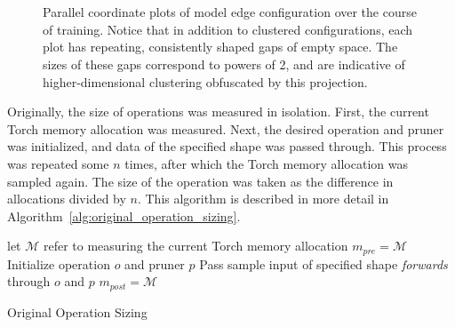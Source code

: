 \begin{figure}
     \\
     \\
	\caption{Parallel coordinate plots of model edge configuration over the course of training. Notice that in addition to
	clustered configurations, each plot has repeating, consistently shaped gaps of empty space. The sizes of these gaps
	correspond to powers of 2, and are indicative of higher-dimensional clustering obfuscated by this projection.}
	\label{fig:lambdapcps}
\end{figure}
\newpage


\ndspzbd

 Originally, the size of operations was measured in isolation. First, the current Torch memory allocation
was measured. Next, the desired operation and pruner was initialized, and data of the specified shape was passed through.
This process was repeated some $n$ times, after which the Torch memory allocation was sampled again. The size of the operation
was taken as the difference in allocations divided by $n$. This algorithm is described in more detail in
Algorithm~\ref{alg:original_operation_sizing}.

\begin{algorithm}
	\SetAlgoLined
	let $\mathcal{M}$ refer to measuring the current Torch memory allocation\;
	$m_{pre} = \mathcal{M}$\;
	 {
		Initialize operation $o$ and pruner $p$\;
		Pass sample input of specified shape \textit{forwards} through $o$ and $p$\;
	}
	$m_{post} = \mathcal{M}$\;
	\caption{Original Operation Sizing}
	\label{alg:original_operation_sizing}
\end{algorithm}

